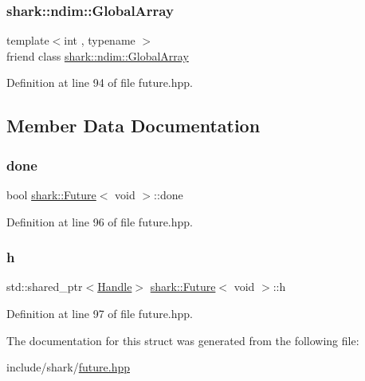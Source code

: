 \subsubsection{\texorpdfstring{shark\+::ndim\+::\+Global\+Array}{shark::ndim::GlobalArray}}
{\footnotesize\ttfamily template$<$int , typename $>$ \\
friend class \hyperlink{classshark_1_1ndim_1_1_global_array}{shark\+::ndim\+::\+Global\+Array}\hspace{0.3cm}{\ttfamily [friend]}}



Definition at line 94 of file future.\+hpp.



\subsection{Member Data Documentation}
\hypertarget{structshark_1_1_future_3_01void_01_4_a3645dd42e1230f037fcdacea7880bb41}{}\label{structshark_1_1_future_3_01void_01_4_a3645dd42e1230f037fcdacea7880bb41} 
\subsubsection{\texorpdfstring{done}{done}}
{\footnotesize\ttfamily bool \hyperlink{structshark_1_1_future}{shark\+::\+Future}$<$ void $>$\+::done}



Definition at line 96 of file future.\+hpp.

\hypertarget{structshark_1_1_future_3_01void_01_4_a6cd84878a921af7b50e18accd766677e}{}\label{structshark_1_1_future_3_01void_01_4_a6cd84878a921af7b50e18accd766677e} 
\subsubsection{\texorpdfstring{h}{h}}
{\footnotesize\ttfamily std\+::shared\+\_\+ptr$<$\hyperlink{classshark_1_1_handle}{Handle}$>$ \hyperlink{structshark_1_1_future}{shark\+::\+Future}$<$ void $>$\+::h}



Definition at line 97 of file future.\+hpp.



The documentation for this struct was generated from the following file\+:\begin{DoxyCompactItemize}
\item 
include/shark/\hyperlink{future_8hpp}{future.\+hpp}\end{DoxyCompactItemize}
